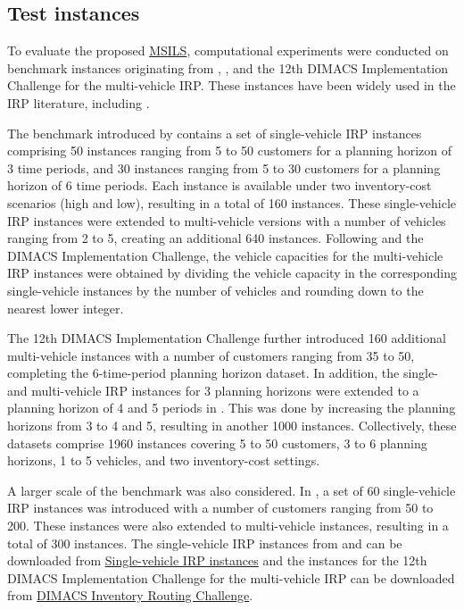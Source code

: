 \documentclass{article}
\begin{document}
\subsection{Test instances} \label{sec: test instances}

To evaluate the proposed \hyperref[alg:MSILS]{MSILS}, computational experiments were conducted on benchmark instances originating from \cite{archetti2007branch}, \cite{archetti2012hybrid}, and the 12th DIMACS Implementation Challenge for the multi-vehicle IRP. These instances have been widely used in the IRP literature, including \cite{archetti2012hybrid, coelho2013branch, desaulniers2016branch, santos2016hybrid, archetti2017logistic, alvarez2018iterated,  archetti2019exact, castro2026hybrid}.

The benchmark introduced by \cite{archetti2007branch} contains a set of single-vehicle IRP instances comprising 50 instances ranging from 5 to 50 customers for a planning horizon of 3 time periods, and 30 instances ranging from 5 to 30 customers for a planning horizon of 6 time periods. Each instance is available under two inventory-cost scenarios (high and low), resulting in a total of 160 instances. These single-vehicle IRP instances were extended to multi-vehicle versions with a number of vehicles ranging from 2 to 5, creating an additional 640 instances. Following \cite{alvarez2018iterated} and the DIMACS Implementation Challenge, the vehicle capacities for the multi-vehicle IRP instances were obtained by dividing the vehicle capacity in the corresponding single-vehicle instances by the number of vehicles and rounding down to the nearest lower integer.

The 12th DIMACS Implementation Challenge further introduced 160 additional multi-vehicle instances with a number of customers ranging from 35 to 50, completing the 6-time-period planning horizon dataset. In addition, the single- and multi-vehicle IRP instances for 3 planning horizons were extended to a planning horizon of 4 and 5 periods in \cite{archetti2017logistic}. This was done by increasing the planning horizons from 3 to 4 and 5, resulting in another 1000 instances. Collectively, these datasets comprise 1960 instances covering 5 to 50 customers, 3 to 6 planning horizons, 1 to 5 vehicles, and two inventory-cost settings. 

A larger scale of the benchmark was also considered. In \cite{archetti2012hybrid}, a set of 60 single-vehicle IRP instances was introduced with a number of customers ranging from 50 to 200. These instances were also extended to multi-vehicle instances, resulting in a total of 300 instances. The single-vehicle IRP instances from \cite{archetti2007branch} and \cite{archetti2012hybrid} can be downloaded from \href{http://www.leandro-coelho.com/instances/inventory-routing/}{Single-vehicle IRP instances} and the instances for the 12th DIMACS Implementation Challenge for the multi-vehicle IRP can be downloaded from \href{https://dimacs.rutgers.edu/programs/implementation-challenges/vehicle-routing/implementation-challenge-vehicle-routing/inventory-routing}{DIMACS Inventory Routing Challenge}. 
\end{document}
